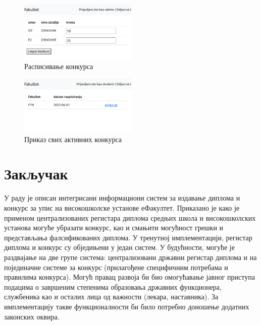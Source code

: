 \documentclass[a4paper]{article}
\begin{document}
\begin{figure}[H]
    \centering
    \includegraphics[width=0.5\textwidth,keepaspectratio]{images/admin_raspisivanje_konkursa.png}
    \caption{Расписивање конкурса}
    \label{fig:admin_raspisivanje_konkursa}
\end{figure}

\begin{figure}[H]
    \centering
    \includegraphics[width=0.5\textwidth,keepaspectratio]{images/student_konkursi.png}
    \caption{Приказ свих активних конкурса}
    \label{fig:student_konkursi}
\end{figure}

\section*{Закључак}

У раду је описан интегрисани информациони систем за издавање диплома и конкурс за упис на високошколске установе еФакултет.
Приказано је како је применом централизованих регистара диплома средњих школа и високошколских установа могуће убразати
конкурс, као и смањити могућност грешки и представљања фалсификованих диплома. У тренутној имплементацији, регистар диплома
и конкурс су обједињени у један систем. У будућности, могуће је раздвајање на две групе система:
централизовани државни регистар диплома и на појединачне системе за конкурс (прилагођене специфичним потребама и
правилима конкурса). Могућ правац развоја би био омогућавање јавног приступа подацима о завршеним степенима образовања
државних функционера, службеника као и осталих лица од важности (лекара, наставника). За имплементацију такве функционалности
би било потребно доношење додатних законских оквира.



\end{document}
